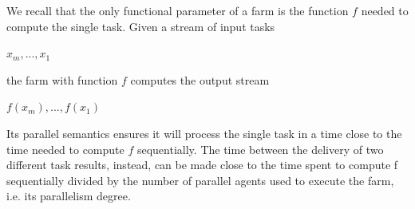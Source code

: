 


We recall that the only functional parameter of a farm is the function \(f\) needed to compute the single task.
Given a stream of input tasks
\begin{center}
	\(x_m , . . . , x_1\)\\
\end{center}
the farm with function \(f\) computes the output stream
\begin{center}
	\(f ( x_m ), . . . , f ( x_1 )\)\\
\end{center}
Its parallel semantics ensures it will process the single task in a time close to the time needed to compute \(f\) sequentially. The time between the delivery of two different task results, instead, can be made close to the time spent to compute f sequentially divided by the number of parallel agents used to execute the farm, i.e. its parallelism degree.
\cite{spm}		


